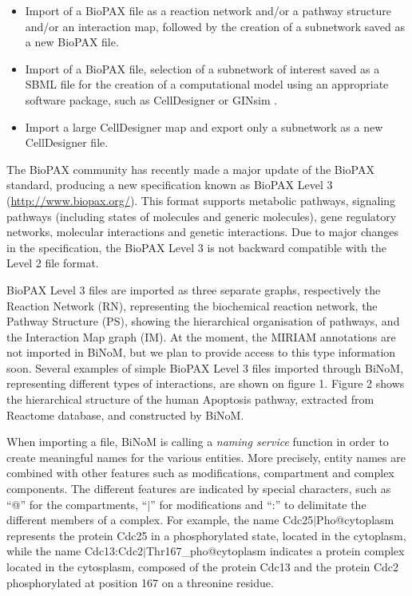 \documentclass[10pt]{bmc_article}
\newenvironment{bmcformat}{\baselineskip20pt\sloppy\setboolean{publ}{false}}{\baselineskip20pt\sloppy}
\begin{document}
\begin{bmcformat}
\begin{itemize}
\item Import of a BioPAX file as a reaction network and/or a pathway structure
and/or an interaction map, followed by the creation of a subnetwork
saved as a new BioPAX file.

\item Import of a BioPAX file, selection of a subnetwork of interest saved as a
SBML file for
the creation of a computational model using an appropriate software package,
such as CellDesigner \cite{funahashi2003celldesigner} or GINsim
\cite{gonzalez2006ginsim}.

\item Import a large CellDesigner map and export only a subnetwork as a new CellDesigner file.

\end{itemize}

The BioPAX
community has recently made a major update of the BioPAX standard, producing a
new specification known as BioPAX Level 3 (\url{http://www.biopax.org/}). This
format supports metabolic pathways, signaling pathways (including states of molecules
and generic molecules), gene regulatory networks, molecular interactions and
genetic interactions. Due to major changes in the
specification, the BioPAX Level 3 is not backward compatible with the Level 2 file format.

BioPAX Level 3 files are imported as three
separate graphs, respectively the Reaction Network (RN), representing the
biochemical reaction network, the Pathway Structure (PS), showing the
hierarchical organisation of pathways, and the Interaction Map graph
(IM). At the moment, the MIRIAM annotations are not imported in BiNoM, but we
plan to provide access to this type information soon. Several examples of simple
BioPAX Level 3 files imported through BiNoM,
representing different types of interactions, are shown on figure 1. Figure 2
shows the hierarchical structure of the human Apoptosis pathway, extracted
from Reactome database, and constructed by BiNoM.

When importing a file, BiNoM is calling a \emph{naming service} function in
order to create meaningful names for the various entities. More precisely,
entity names are combined with other features such as modifications, compartment
and complex components. The different features are indicated by special
characters, such as ``@'' for the compartments, ``$|$'' for modifications and
``:'' to delimitate the different members of a complex. For example, the
name Cdc25$|$Pho@cytoplasm represents the protein Cdc25 in a phosphorylated
state, located in the cytoplasm, while the name
Cdc13:Cdc2$|$Thr167\_pho@cytoplasm indicates a protein complex located in the
cytosplasm, composed of the protein Cdc13 and the protein Cdc2 phosphorylated at
position 167 on a threonine residue.



\end{bmcformat}
\end{document}
